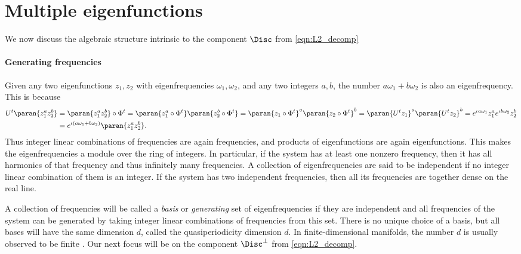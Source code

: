 \documentclass[12pt,oneside]{article}
\begin{document}
\section{Multiple eigenfunctions} \label{sec:multiple}

We now discuss the algebraic structure intrinsic to the component $\Disc$ from \eqref{eqn:L2_decomp}

\paragraph{Generating frequencies} Given any two eigenfunctions $z_1, z_2$ with eigenfrequencies $\omega_1, \omega_2$, and any two integers $a,b$, the number $a\omega_1 + b\omega_2$ is also an eigenfrequency. This is because 
%
\[\begin{split}
    U^t \paran{ z_1^a z_2^b } &= \paran{ z_1^a z_2^b } \circ \Phi^t = \paran{ z_1^a \circ \Phi^t } \paran{ z_2^b \circ \Phi^t } = \paran{ z_1 \circ \Phi^t }^a \paran{ z_2 \circ \Phi^t }^b = \paran{ U^t z_1}^a \paran{ U^t z_2}^b = e^{\iota a \omega_1} z_1^a e^{\iota b \omega_2} z_2^b \\
    &= e^{\iota(a \omega_1 + b\omega_2)} \paran{ z_1^a z_2^b } .
\end{split}\]
	Thus integer linear combinations of frequencies are again frequencies, and products of eigenfunctions are again eigenfunctions. This makes the eigenfrequencies a module over the ring of integers. In particular, if the system has at least one nonzero frequency, then it has all harmonics of that frequency and thus infinitely many frequencies. A collection of eigenfrequencies are said to be independent if no integer linear combination of them is an integer.
	If the system has two independent frequencies, then all its frequencies are together dense on the real line. 
 
A collection of frequencies will be called a \emph{basis} or \emph{generating} set of eigenfrequencies if they are independent and all frequencies of the system can be generated by taking integer linear combinations of frequencies from this set. There is no unique choice of a basis, but all bases will have the same dimension $d$, called the quasiperiodicity dimension $d$. In finite-dimensional manifolds, the number $d$ is usually observed to be finite \citep[e.g.][Sec 3]{DasGiannakis_delay_2019}.  Our next focus will be on the component $\Disc^\bot$ from \eqref{eqn:L2_decomp}.
\end{document}
